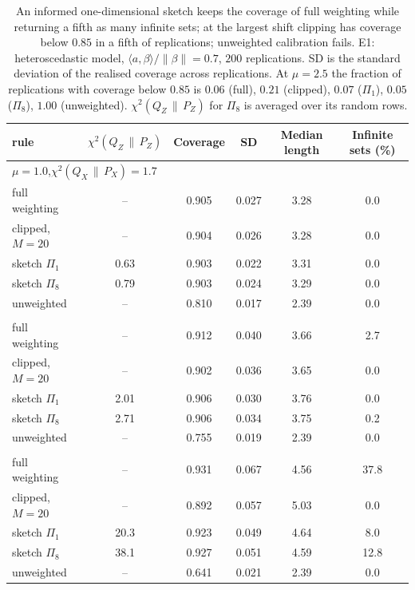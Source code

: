 \documentclass[11pt,a4paper]{article}
\newcommand{\PX}{P_X}
\newcommand{\QX}{Q_X}
\newcommand{\chisq}{\chi^2(\QX\,\|\,\PX)}
\newcommand{\chisqZ}{\chi^2(Q_Z\,\|\,P_Z)}
\newcommand{\norm}[1]{\left\|#1\right\|}
\theoremstyle{plain}
\theoremstyle{definition}
\theoremstyle{remark}
\begin{document}
\begin{table}[!htbp]\centering\footnotesize\setlength{\tabcolsep}{5pt}
\begin{tabular}{lccccc}
\toprule
rule & $\chisqZ$ & Coverage & SD & Median length & Infinite sets (\%)\\
\midrule
\multicolumn{6}{l}{$\mu=1.0$,\quad $\chisq=1.7$}\\
full weighting & -- & 0.905 & 0.027 & 3.28 & 0.0\\
clipped, $M=20$ & -- & 0.904 & 0.026 & 3.28 & 0.0\\
sketch $\Pi_1$ & 0.63 & 0.903 & 0.022 & 3.31 & 0.0\\
sketch $\Pi_8$ & 0.79 & 0.903 & 0.024 & 3.29 & 0.0\\
unweighted & -- & 0.810 & 0.017 & 2.39 & 0.0\\
\addlinespace
\multicolumn{6}{l}{$\mu=1.5$,\quad $\chisq=8.5$}\\
full weighting & -- & 0.912 & 0.040 & 3.66 & 2.7\\
clipped, $M=20$ & -- & 0.902 & 0.036 & 3.65 & 0.0\\
sketch $\Pi_1$ & 2.01 & 0.906 & 0.030 & 3.76 & 0.0\\
sketch $\Pi_8$ & 2.71 & 0.906 & 0.034 & 3.75 & 0.2\\
unweighted & -- & 0.755 & 0.019 & 2.39 & 0.0\\
\addlinespace
\multicolumn{6}{l}{$\mu=2.5$,\quad $\chisq=517$}\\
full weighting & -- & 0.931 & 0.067 & 4.56 & 37.8\\
clipped, $M=20$ & -- & 0.892 & 0.057 & 5.03 & 0.0\\
sketch $\Pi_1$ & 20.3 & 0.923 & 0.049 & 4.64 & 8.0\\
sketch $\Pi_8$ & 38.1 & 0.927 & 0.051 & 4.59 & 12.8\\
unweighted & -- & 0.641 & 0.021 & 2.39 & 0.0\\
\bottomrule
\end{tabular}
\caption{An informed one-dimensional sketch keeps the coverage of full weighting while returning a fifth as many infinite sets; at the largest shift clipping has coverage below $0.85$ in a fifth of replications; unweighted calibration fails. E1: heteroscedastic model, $\langle a,\beta\rangle/\norm\beta=0.7$, $200$ replications. SD is the standard deviation of the realised coverage across replications. At $\mu=2.5$ the fraction of replications with coverage below $0.85$ is $0.06$ (full), $0.21$ (clipped), $0.07$ ($\Pi_1$), $0.05$ ($\Pi_8$), $1.00$ (unweighted). $\chisqZ$ for $\Pi_8$ is averaged over its random rows.}\label{tab:hetero}
\end{table}
\end{document}
